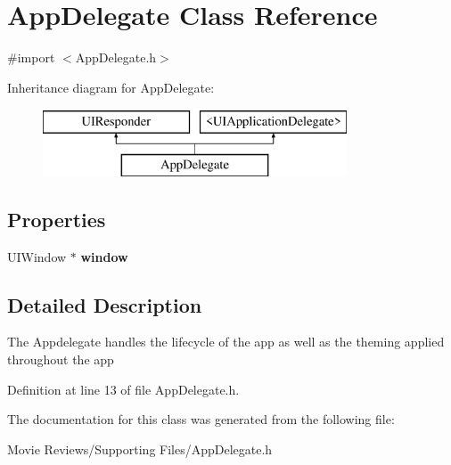 \section{App\+Delegate Class Reference}
\label{interface_app_delegate}


{\ttfamily \#import $<$App\+Delegate.\+h$>$}

Inheritance diagram for App\+Delegate\+:\begin{figure}[H]
\begin{center}
\leavevmode
\includegraphics[height=2.000000cm]{interface_app_delegate}
\end{center}
\end{figure}
\subsection*{Properties}
\begin{DoxyCompactItemize}
\item 
U\+I\+Window $\ast$ {\bfseries window}\label{interface_app_delegate_acf48ac24125e688cac1a85445cd7fac2}

\end{DoxyCompactItemize}


\subsection{Detailed Description}
The Appdelegate handles the lifecycle of the app as well as the theming applied throughout the app 

Definition at line 13 of file App\+Delegate.\+h.



The documentation for this class was generated from the following file\+:\begin{DoxyCompactItemize}
\item 
Movie Reviews/\+Supporting Files/App\+Delegate.\+h\end{DoxyCompactItemize}
